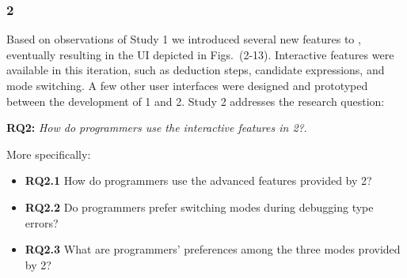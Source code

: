   







\subsubsection{\textbf{\chameleon{} 2}}  \label{sub:us4}
Based on observations of Study 1 we introduced several new features to \chameleon{}, eventually resulting in the UI depicted in Figs.~(2-13). Interactive features were available in this iteration, such as deduction steps, candidate expressions, and mode switching. A few other user interfaces \cite{Fu2021-xd} were designed and prototyped between the development of \chameleon{} 1 and \chameleon{} 2. Study 2 addresses the research question: 

\noindent\textbf{RQ2:} \textit{How do programmers use the interactive features in \chameleon{} 2?}. 

More specifically:
\begin{itemize}
    \item \textbf{RQ2.1} How do programmers use the advanced features provided by \chameleon{} 2?
    \item \textbf{RQ2.2} Do programmers prefer switching modes during debugging type errors?
    \item  \textbf{RQ2.3} What are programmers' preferences among the three modes provided by \chameleon{} 2?


\end{itemize}

